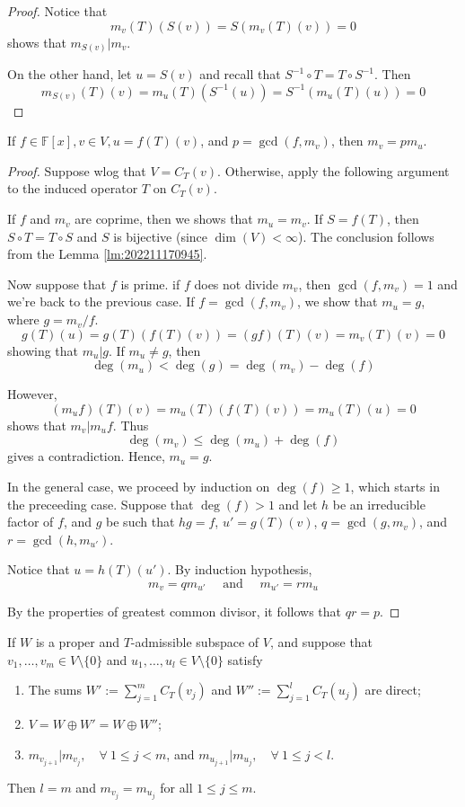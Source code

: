 \begin{proof}
	Notice that 
	\[
		m_v(T)(S(v)) = S(m_v(T)(v)) = 0
	\]
	shows that $m_{S(v)} | m_v$. 
	
	On the other hand, let $u = S(v)$ and recall that $S^{-1} \circ T = T \circ S^{-1}$. Then
	\[
		m_{S(v)}(T)(v) = m_u(T)(S^{-1}(u)) = S^{-1}(m_u(T)(u)) = 0
	\]
\end{proof}

\begin{lemma}\label{lm:202211170946}
	If $f \in \mathbb{F}[x], v \in V, u = f(T)(v)$, and $p = \gcd(f, m_v)$, then $m_v = p m_u$.
\end{lemma}

\begin{proof}
	Suppose wlog that $V = C_T(v)$. Otherwise, apply the following argument to the induced operator $T$ on $C_T(v)$.
	
	If $f$ and $m_v$ are coprime, then we shows that $m_u = m_v$. If $S = f(T)$, then $S \circ T = T \circ S$ and $S$ is bijective (since $\dim(V) < \infty$). The conclusion follows from the Lemma \ref{lm:202211170945}.
	
	Now suppose that $f$ is prime. if $f$ does not divide $m_v$, then $\gcd(f, m_v) = 1$ and we're back to the previous case. If $f = \gcd(f, m_v)$, we show that $m_u = g$, where $g = m_v / f$.
	\[
		g(T)(u) = g(T)(f(T)(v)) = (gf)(T)(v) = m_v(T)(v) = 0
	\]
	showing that $m_u | g$. If $m_u \neq g$, then 
	\[
		\deg(m_u) < \deg(g) = \deg(m_v) - \deg(f)
	\]
	
	However,
	\[
		(m_u f)(T)(v) = m_u(T)(f(T)(v)) = m_u(T)(u) = 0
	\]
	shows that $m_v | m_u f$. Thus
	\[
		\deg(m_v) \leq \deg(m_u) + \deg(f)
	\]
	gives a contradiction. Hence, $m_u = g$.
	
	In the general case, we proceed by induction on $\deg(f) \geq 1$, which starts in the preceeding case. Suppose that $\deg(f) > 1$ and let $h$ be an irreducible factor of $f$, and $g$ be such that $hg = f$, $u' = g(T)(v)$, $q = \gcd(g, m_v)$, and $r = \gcd(h, m_{u'})$.
	
	Notice that $u = h(T)(u')$. By induction hypothesis,
	\[
		m_v = q m_{u'} \quad \text{ and } \quad m_{u'} = r m_u
	\]
	
	By the properties of greatest common divisor, it follows that $q r = p$.
\end{proof}

\begin{theorem}
  If $W$ is a proper and $T$-admissible subspace of $V$, and suppose that $v_1, \ldots, v_m \in V \setminus \{ 0 \}$ and $u_1, \ldots, u_l \in V \setminus \{ 0 \}$ satisfy
	\begin{enumerate}
    \item The sums $W' := \sum_{j=1}^m C_T(v_j)$ and $W'' := \sum_{j=1}^l C_T(u_j)$ are direct;
    \item $V = W \oplus W' = W \oplus W''$;
    \item $m_{v_{j+1}} | m_{v_j}, \quad \forall ~1 \leq j < m$, and $m_{u_{j+1}} | m_{u_j}, \quad \forall ~1 \leq j < l$.
	\end{enumerate}
  Then $l = m$ and $m_{v_j} = m_{u_j}$ for all $1 \leq j \leq m$.
\end{theorem}

